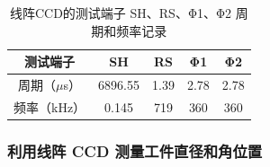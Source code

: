 \documentclass[dvipsnames, svgnames,a4paper,11pt]{article}
\begin{document}
			\begin{table}
				\centering
				\begin{tabular}{|c|cccc|} 
				\hline
				测试端子    & SH      & RS   & Φ1   & Φ2    \\ 
				\hline
				周期（$\mu$s） & 6896.55 & 1.39 & 2.78 & 2.78  \\
				频率（kHz） & 0.145   & 719  & 360  & 360   \\
				\hline
				\end{tabular}
				\caption{线阵CCD的测试端子 SH、RS、Φ1、Φ2 周期和频率记录}
				\label{tbl:线阵CCD的测试端子 SH、RS、Φ1、Φ2 周期和频率记录}
			\end{table}






	\subsubsection{利用线阵 CCD 测量工件直径和角位置}
\end{document}
